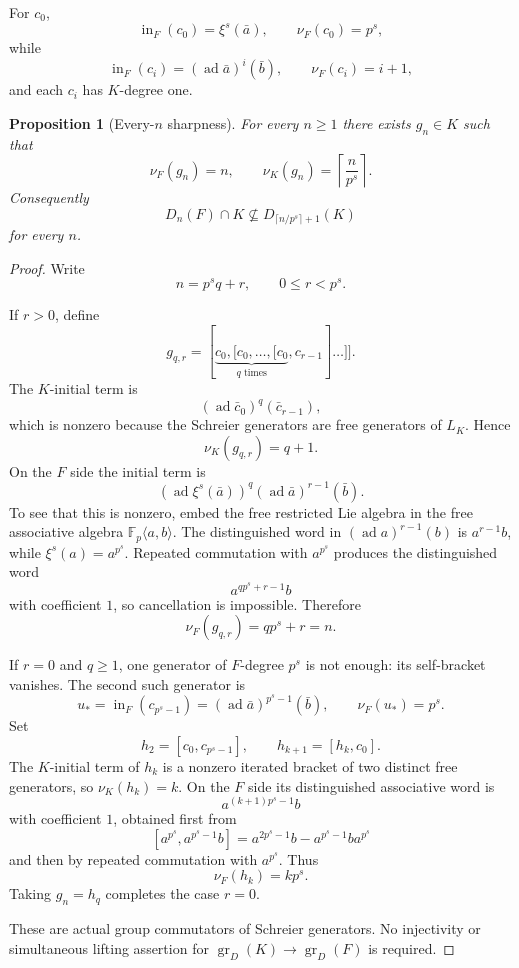 \documentclass[11pt]{article}
\newtheorem{proposition}[theorem]{Proposition}
\begin{document}
For $c_0$,
\[
\operatorname{in}_F(c_0)=\xi^s(\bar a),
\qquad \nu_F(c_0)=p^s,
\]
while
\[
\operatorname{in}_F(c_i)
=(\operatorname{ad}\bar a)^i(\bar b),
\qquad \nu_F(c_i)=i+1,
\]
and each $c_i$ has $K$-degree one.

\begin{proposition}[Every-$n$ sharpness]
For every $n\ge1$ there exists $g_n\in K$ such that
\[
\boxed{
\nu_F(g_n)=n,
\qquad
\nu_K(g_n)=\left\lceil\frac n{p^s}\right\rceil.
}
\]
Consequently
\[
D_n(F)\cap K\not\subseteq
D_{\lceil n/p^s\rceil+1}(K)
\]
for every $n$.
\end{proposition}

\begin{proof}
Write
\[
n=p^sq+r,\qquad 0\le r<p^s.
\]

If $r>0$, define
\[
g_{q,r}
=
[\underbrace{c_0,[c_0,\ldots,[c_0}_{q\text{ times}},c_{r-1}]\ldots]].
\]
The $K$-initial term is
\[
(\operatorname{ad}\bar c_0)^q(\bar c_{r-1}),
\]
which is nonzero because the Schreier generators are free generators of
$L_K$.  Hence
\[
\nu_K(g_{q,r})=q+1.
\]
On the $F$ side the initial term is
\[
(\operatorname{ad}\xi^s(\bar a))^q
(\operatorname{ad}\bar a)^{r-1}(\bar b).
\]
To see that this is nonzero, embed the free restricted Lie algebra in
the free associative algebra $\mathbb F_p\langle a,b\rangle$.
The distinguished word in
$(\operatorname{ad}a)^{r-1}(b)$ is $a^{r-1}b$, while
$\xi^s(a)=a^{p^s}$.  Repeated commutation with $a^{p^s}$ produces the
distinguished word
\[
a^{qp^s+r-1}b
\]
with coefficient $1$, so cancellation is impossible.  Therefore
\[
\nu_F(g_{q,r})=qp^s+r=n.
\]

If $r=0$ and $q\ge1$, one generator of $F$-degree $p^s$ is not enough:
its self-bracket vanishes.  The second such generator is
\[
u_*=
\operatorname{in}_F(c_{p^s-1})
=
(\operatorname{ad}\bar a)^{p^s-1}(\bar b),
\qquad \nu_F(u_*)=p^s.
\]
Set
\[
h_2=[c_0,c_{p^s-1}],
\qquad
h_{k+1}=[h_k,c_0].
\]
The $K$-initial term of $h_k$ is a nonzero iterated bracket of two
distinct free generators, so $\nu_K(h_k)=k$.  On the $F$ side its
distinguished associative word is
\[
a^{(k+1)p^s-1}b
\]
with coefficient $1$, obtained first from
\[
[a^{p^s},a^{p^s-1}b]
=
a^{2p^s-1}b-a^{p^s-1}ba^{p^s}
\]
and then by repeated commutation with $a^{p^s}$.  Thus
\[
\nu_F(h_k)=kp^s.
\]
Taking $g_n=h_q$ completes the case $r=0$.

These are actual group commutators of Schreier generators.  No
injectivity or simultaneous lifting assertion for
$\operatorname{gr}_D(K)\to\operatorname{gr}_D(F)$ is required.
\end{proof}
\end{document}
